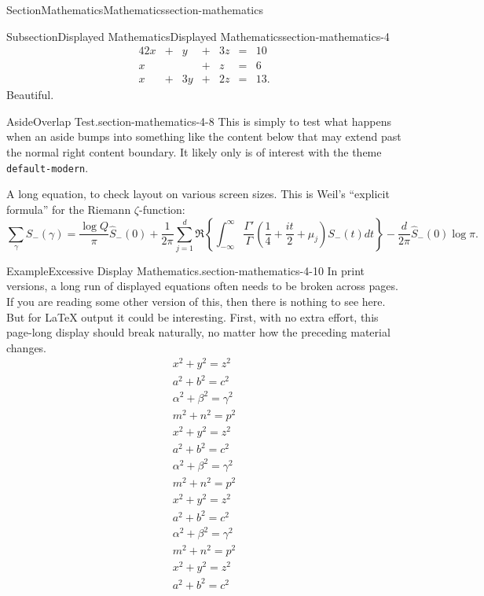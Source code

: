 \documentclass[twoside,10pt,]{article}
\newcommand{\mono}[1]{\texttt{#1}}
\numberwithin{equation}{section}
\newcommand{\amp}{&}
\begin{document}
\begin{sectionptx}{Section}{Mathematics}{}{Mathematics}{}{}{section-mathematics}
\begin{subsectionptx}{Subsection}{Displayed Mathematics}{}{Displayed Mathematics}{}{}{section-mathematics-4}
\begin{alignat*}{4}
2x \amp {}+{} \amp  y \amp {}+{} \amp 3z \amp {}={} \amp 10\\
x  \amp       \amp    \amp {}+{} \amp  z \amp {}={} \amp 6\\
x  \amp {}+{} \amp 3y \amp {}+{} \amp 2z \amp {}={} \amp 13.
\end{alignat*}
Beautiful.%
\begin{aside}{Aside}{Overlap Test.}{section-mathematics-4-8}%
This is simply to test what happens when an aside bumps into something like the content below that may extend past the normal right content boundary. It likely only is of interest with the theme \mono{default-modern}.%
\end{aside}
A long equation, to check layout on various screen sizes.  This is Weil's ``explicit formula'' for the Riemann \(\zeta\)-function:%
\begin{equation}
\sum_\gamma S_-(\gamma) = \frac{\log Q}{\pi} \hat S_-(0)
+ \frac{1}{2\pi} \sum_{j=1}^d \Re\left\{ \int_{-\infty}^\infty \frac{\Gamma'}{\Gamma}\left(\frac{1}{4} + \frac{it}{2} + \mu_j\right)S_-(t) dt\right\}
- \frac{d}{2\pi}\hat S_-(0)\log \pi\text{.}\label{section-mathematics-4-9-3}
\end{equation}
%
\begin{example}{Example}{Excessive Display Mathematics.}{section-mathematics-4-10}%
In print versions, a long run of displayed equations often needs to be broken across pages.  If you are reading some other version of this, then there is nothing to see here.  But for \LaTeX{} output it could be interesting.  First, with no extra effort, this page-long display should break naturally, no matter how the preceding material changes.%
\begin{gather*}
x^2+y^2=z^2\\
a^2+b^2=c^2\\
\alpha^2+\beta^2=\gamma^2\\
m^2+n^2=p^2\\
x^2+y^2=z^2\\
a^2+b^2=c^2\\
\alpha^2+\beta^2=\gamma^2\\
m^2+n^2=p^2\\
x^2+y^2=z^2\\
a^2+b^2=c^2\\
\alpha^2+\beta^2=\gamma^2\\
m^2+n^2=p^2\\
x^2+y^2=z^2\\
a^2+b^2=c^2\\

\end{gather*}
\end{example}
\end{subsectionptx}
\end{sectionptx}
\end{document}
